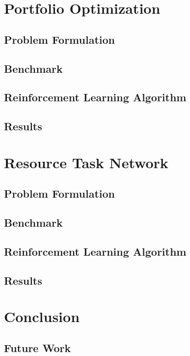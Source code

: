 \documentclass[12pt]{article}
\begin{document}
\section{Portfolio Optimization}

\subsection{Problem Formulation}

\subsection{Benchmark}

\subsection{Reinforcement Learning Algorithm}

\subsection{Results}

\section{Resource Task Network}

\subsection{Problem Formulation}

\subsection{Benchmark}

\subsection{Reinforcement Learning Algorithm}

\subsection{Results}

\section{Conclusion}

\subsection{Future Work}

\newpage


\end{document}
